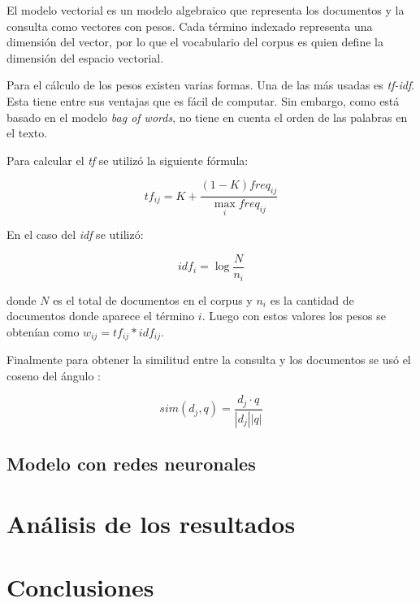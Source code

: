 \documentclass[12pt]{article}
\begin{document}
El modelo vectorial\cite{vectormodel} es un modelo algebraico que representa los documentos
y la consulta como vectores con pesos. Cada término indexado representa
una dimensión del vector, por lo que el vocabulario del corpus es
quien define la dimensión del espacio vectorial.

Para el cálculo de los pesos existen varias formas. Una de las más 
usadas es \textit{tf-idf}. Esta tiene entre sus ventajas que es 
fácil de computar. Sin embargo, como está basado en el modelo
\textit{bag of words}, no tiene en cuenta el orden de las palabras
en el texto.

Para calcular el \textit{tf} se utilizó la siguiente fórmula:

$$tf_{ij} = K + \frac{(1-K)freq_{ij}}{\max_{i} freq_{ij}}$$

En el caso del \textit{idf} se utilizó:

$$idf_i= \log \frac{N}{n_i}$$

donde $N$ es el total de documentos en el corpus y $n_i$ es la
cantidad de documentos donde aparece el término $i$. Luego con estos 
valores los pesos se obtenían como $w_{ij}= tf_{ij}*idf_{ij}$.

Finalmente para obtener la similitud entre la consulta y los 
documentos se usó el coseno del ángulo :

$$sim(d_{j},q) = \frac{ d_{j} \cdot q }{ |d_{j}||q| }$$


\subsection{Modelo con redes neuronales}


\section{Análisis de los resultados} 


\section{Conclusiones} %




% 

\end{document}
